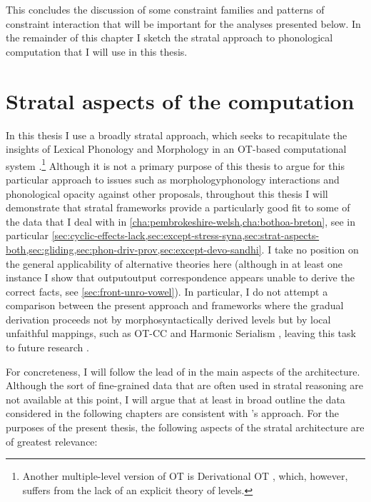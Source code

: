 This concludes the discussion of some constraint families and patterns of constraint interaction that will be important for the analyses presented below. In the remainder of this chapter I sketch the stratal approach to phonological computation that I will use in this thesis.

\section{Stratal aspects of the computation}
\label{sec:strat-aspects-comp}

In this thesis I use a broadly stratal approach, which seeks to recapitulate the insights of Lexical Phonology and Morphology \citep[\egm][]{kiparsky82:_lexic_phonol_morph,kiparsky85:_some_lexic_phonol,borowsky86:_topic_englis,mohanan,hargus93:_studies_lexic_phonol,mcmahon00:_lexic_phonol_englis} in an OT\hyp based computational system \citep[\egm][]{kiparsky00:_opacit,kiparsky08:_fenno_swedis,kiparsky11:_chain,bermudez-otero99:_const,bermudez-otero03,bermudez-otero06:_morph_spanis,bermudez-diachr,bermúdez-otero11:_cyclic,bermudez-oterong,plapp99,blumenfeld03,moren06:_thai}.\footnote{Another multiple\hyp level version of OT is Derivational OT \citep[\egm][]{rubach2000,rubach05}, which, however, suffers from the lack of an explicit theory of levels.} Although it is not a primary purpose of this thesis to argue for this particular approach to issues such as morphology\endash phonology interactions and phonological opacity against other proposals, throughout this thesis I will demonstrate that stratal frameworks provide a particularly good fit to some of the data that I deal with in \cref{cha:pembrokeshire-welsh,cha:bothoa-breton}, see in particular \cref{sec:cyclic-effects-lack,sec:except-stress-syna,sec:strat-aspects-both,sec:gliding,sec:phon-driv-prov,sec:except-devo-sandhi}. I take no position on the general applicability of alternative theories here (although in at least one instance I show that output\endash output correspondence appears unable to derive the correct facts, see \cref{sec:front-unro-vowel}). In particular, I do not attempt a comparison between the present approach and frameworks where the gradual derivation proceeds not by morphosyntactically derived levels but by local unfaithful mappings, such as OT-CC \citep{mccarthy07:_hidden,wolf08:_optim_inter} and Harmonic Serialism \citep[\egm][]{hg-hs}, leaving this task to future research \citep[although \cf][]{kiparsky11:_chain}.

For concreteness, I will follow the lead of \citet{bermúdez-otero11:_cyclic,bermudez-oterong} in the main aspects of the architecture. Although the sort of fine\hyp grained data that are often used in stratal reasoning are not available at this point, I will argue that at least in broad outline the data considered in the following chapters are consistent with \citeauthor{bermudez-oterong}'s approach. For the purposes of the present thesis, the following aspects of the stratal architecture are of greatest relevance:

